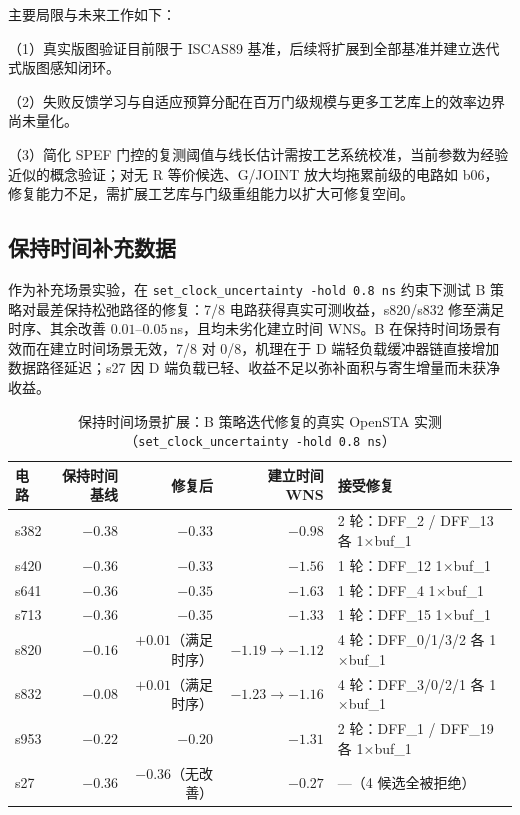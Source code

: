 \documentclass[journal]{IEEEtran}
\begin{document}
主要局限与未来工作如下：

（1）真实版图验证目前限于 ISCAS89 基准，后续将扩展到全部基准并建立迭代式版图感知闭环。

（2）失败反馈学习与自适应预算分配在百万门级规模与更多工艺库上的效率边界尚未量化。

（3）简化 SPEF 门控的复测阈值与线长估计需按工艺系统校准，当前参数为经验近似的概念验证；对无 R 等价候选、G/JOINT 放大均拖累前级的电路如 b06，修复能力不足，需扩展工艺库与门级重组能力以扩大可修复空间。

\begin{appendices}
\section{保持时间补充数据}\label{app:hold}

作为补充场景实验，在 \texttt{set\_clock\_uncertainty -hold 0.8\,ns} 约束下测试 B 策略对最差保持松弛路径的修复：7/8 电路获得真实可测收益，s820/s832 修至满足时序、其余改善 $0.01$--$0.05\,$ns，且均未劣化建立时间 WNS。B 在保持时间场景有效而在建立时间场景无效，7/8 对 0/8，机理在于 D 端轻负载缓冲器链直接增加数据路径延迟；s27 因 D 端负载已轻、收益不足以弥补面积与寄生增量而未获净收益。

\begin{table}[!htbp]
\centering
\caption{保持时间场景扩展：B 策略迭代修复的真实 OpenSTA 实测（\texttt{set\_clock\_uncertainty -hold 0.8\,ns}）}
\label{tab:hold}
\scriptsize
\setlength{\tabcolsep}{2pt}
\begin{tabular}{lrrrp{2.0cm}}
\toprule
\textbf{电路} & \textbf{保持时间基线} & \textbf{修复后} & \textbf{建立时间 WNS} & \textbf{接受修复} \\
\midrule
s382 & $-0.38$ & $-0.33$ & $-0.98$ & 2 轮：DFF\_2 / DFF\_13 各 1$\times$buf\_1 \\
s420 & $-0.36$ & $-0.33$ & $-1.56$ & 1 轮：DFF\_12 1$\times$buf\_1 \\
s641 & $-0.36$ & $-0.35$ & $-1.63$ & 1 轮：DFF\_4 1$\times$buf\_1 \\
s713 & $-0.36$ & $-0.35$ & $-1.33$ & 1 轮：DFF\_15 1$\times$buf\_1 \\
s820 & $-0.16$ & $+0.01$（满足时序） & $-1.19\rightarrow -1.12$ & 4 轮：DFF\_0/1/3/2 各 1$\times$buf\_1 \\
s832 & $-0.08$ & $+0.01$（满足时序） & $-1.23\rightarrow -1.16$ & 4 轮：DFF\_3/0/2/1 各 1$\times$buf\_1 \\
s953 & $-0.22$ & $-0.20$ & $-1.31$ & 2 轮：DFF\_1 / DFF\_19 各 1$\times$buf\_1 \\
s27 & $-0.36$ & $-0.36$（无改善） & $-0.27$ & ---（4 候选全被拒绝） \\
\bottomrule
\end{tabular}
\end{table}

\end{appendices}
\end{document}
